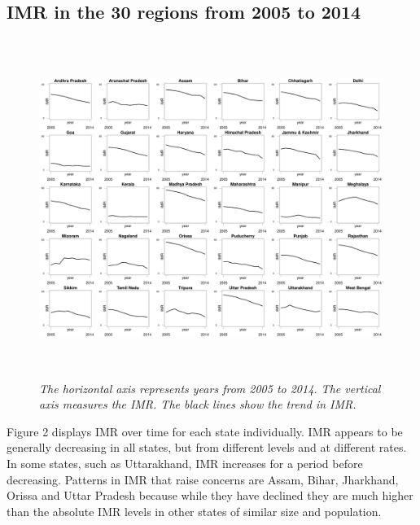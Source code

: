 \documentclass{article}
\begin{document}
\subsection{IMR in the 30 regions from 2005 to 2014}
\begin{figure}[H]
   \begin{center}
   \includegraphics[height = 11cm, width = 15cm]{state_imr.pdf}
   \end{center}
   \caption{\emph{The horizontal axis represents years from 2005 to 2014. The vertical axis measures the IMR. The black lines show the trend in IMR.}}
\end{figure}
Figure 2 displays IMR over time for each state individually.  IMR appears to be generally decreasing in all states, but from different levels and at different rates.  In some states, such as Uttarakhand, IMR increases for a period before decreasing. Patterns in IMR that raise concerns are Assam, Bihar, Jharkhand, Orissa and Uttar Pradesh because while they have declined they are much higher than the absolute IMR levels in other states of similar size and population.
\end{document}
